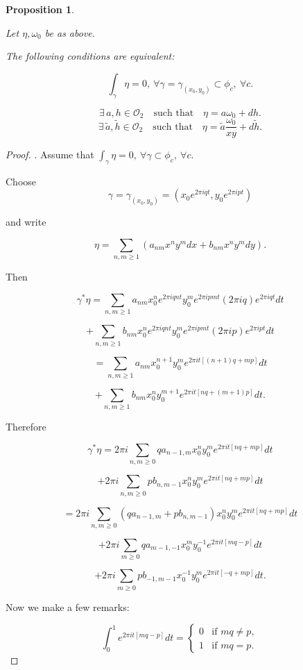 \documentclass[11pt,a4paper]{amsart}
\newtheorem{proposition}[theorem]{Proposition}
\theoremstyle{definition}
\begin{document}
\begin{proposition}
\label{proposition:homology}

Let $\eta,\omega_0$ be as above.

The following conditions are equivalent:

\[
\int_\gamma \eta =0,\ \forall \gamma=\gamma_{(x_0,y_0)}\subset\phi_c,\ \forall c.
\]

\[
\exists\, a,h\in\mathcal{O}_2
\quad \text{such that}
\quad
\eta=a\omega_0+dh.
\]
\[
\exists\, \tilde a,\tilde h\in\mathcal{O}_2
\quad \text{such that}
\quad
\eta=\tilde a\frac{\omega_0}{xy}+d \tilde h.
\]

\end{proposition}
\begin{proof}
. 
Assume that $\int_\gamma\eta=0,\ \forall\gamma\subset\phi_c,\ \forall c$.

Choose
\[
\gamma=\gamma_{(x_0,y_0)}
=
(x_0e^{2\pi iqt},y_0e^{2\pi ipt})
\]

and write

\[
\eta=\sum_{n,m\ge1}(a_{nm}x^ny^m dx+b_{nm}x^ny^m dy).
\]

Then

\[
\gamma^*\eta
=
\sum_{n,m\ge1}
a_{nm}x_0^ne^{2\pi iqnt}y_0^me^{2\pi ipmt}(2\pi iq)e^{2\pi iqt}dt
\]

\[
+
\sum_{n,m\ge1}
b_{nm}x_0^ne^{2\pi iqnt}y_0^me^{2\pi ipmt}(2\pi ip)e^{2\pi ipt}dt
\]

\[
=
\sum_{n,m\ge1}
a_{nm}x_0^{n+1}y_0^m
e^{2\pi it[(n+1)q+mp]}dt
\]

\[
+
\sum_{n,m\ge1}
b_{nm}x_0^ny_0^{m+1}
e^{2\pi it[nq+(m+1)p]}dt.
\]

Therefore

\[
\gamma^*\eta
=
2\pi i
\sum_{n,m\ge0}
q a_{n-1,m}x_0^ny_0^m
e^{2\pi it[nq+mp]}dt
\]

\[
+
2\pi i
\sum_{n,m\ge0}
p b_{n,m-1}x_0^ny_0^m
e^{2\pi it[nq+mp]}dt
\]

\[
=
2\pi i
\sum_{n,m\ge0}
(q a_{n-1,m}+p b_{n,m-1})
x_0^ny_0^m
e^{2\pi it[nq+mp]}dt
\]

\[
+
2\pi i
\sum_{m\ge0}
q a_{m-1,-1}
x_0^my_0^{-1}
e^{2\pi it[mq-p]}dt
\]

\[
+
2\pi i
\sum_{m\ge0}
p b_{-1,m-1}
x_0^{-1}y_0^m
e^{2\pi it[-q+mp]}dt.
\]


Now we make a few remarks:

\[
\int_0^1 e^{2\pi it[mq-p]}dt
=
\begin{cases}
0 & \text{if } mq\neq p,\\
1 & \text{if } mq=p.
\end{cases}
\]


\end{proof}
\end{document}
